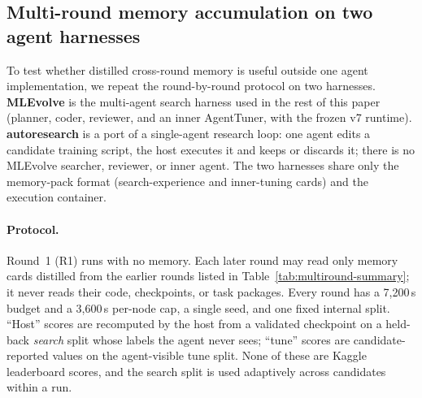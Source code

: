 
\subsection{Multi-round memory accumulation on two agent harnesses}
\label{sec:multiround-two-harness}

To test whether distilled cross-round memory is useful outside one agent
implementation, we repeat the round-by-round protocol on two harnesses.
\textbf{MLEvolve} is the multi-agent search harness used in the rest of this
paper (planner, coder, reviewer, and an inner AgentTuner, with the frozen v7
runtime).  \textbf{autoresearch} is a port of a single-agent research loop:
one agent edits a candidate training script, the host executes it and keeps or
discards it; there is no MLEvolve searcher, reviewer, or inner agent.  The two
harnesses share only the memory-pack format (search-experience and
inner-tuning cards) and the execution container.

\paragraph{Protocol.}
Round~1 (R1) runs with no memory.  Each later round may read only memory cards
distilled from the earlier rounds listed in Table~\ref{tab:multiround-summary};
it never reads their code, checkpoints, or task packages.  Every round has a
7{,}200\,s budget and a 3{,}600\,s per-node cap, a single seed, and one fixed
internal split.  ``Host'' scores are recomputed by the host from a validated
checkpoint on a held-back \emph{search} split whose labels the agent never sees;
``tune'' scores are candidate-reported values on the agent-visible tune split.
None of these are Kaggle leaderboard scores, and the search split is used
adaptively across candidates within a run.

